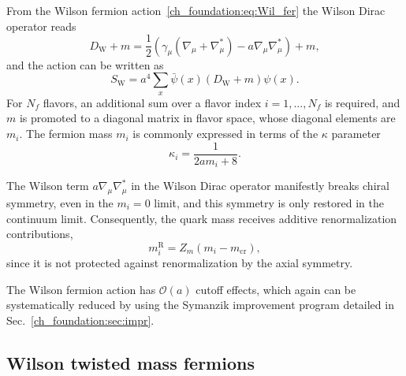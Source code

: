From the Wilson fermion action~\eqref{ch_foundation:eq:Wil_fer} the Wilson Dirac operator reads
\begin{equation}
\label{ch_foundation:eq:DW}
D_{\textrm{W}}+m=\frac{1}{2}\left(\gamma_{\mu}\left(\nabla_{\mu}+\nabla_{\mu}^*\right)-a\nabla_{\mu}\nabla_{\mu}^*\right)+m,
\end{equation}
and the action can be written as
\begin{equation}
S_{\textrm{W}}=a^4\sum_x\bar{\psi}(x)\left(D_{\textrm{W}}+m\right)\psi(x).
\end{equation}
For $N_f$ flavors, an additional sum over a flavor index $i=1,...,N_f$ is required, and $m$ is promoted to a diagonal matrix in flavor space, whose diagonal elements are $m_i$. The fermion mass $m_i$ is commonly expressed in terms of the $\kappa$ parameter
\begin{equation}
\label{ch_foundation:eq:kappa}
\kappa_i=\frac{1}{2am_i+8}.
\end{equation}

The Wilson term $a\nabla_{\mu}\nabla_{\mu}^*$ in the Wilson Dirac operator manifestly breaks chiral symmetry, even in the $m_i=0$ limit, and this symmetry is only restored in the continuum limit. Consequently, the quark mass receives additive renormalization contributions, 
\begin{equation}
m_i^{\textrm{R}}=Z_m\left(m_i-m_{\textrm{cr}}\right),
\end{equation}
since it is not protected against renormalization by the axial symmetry.

The Wilson fermion action has $\mathcal{O}(a)$ cutoff effects, which again can be systematically reduced by using the Symanzik improvement program detailed in Sec.~\ref{ch_foundation:sec:impr}.


\subsection{Wilson twisted mass fermions}
\label{ch_foundation:subsec:tm}

